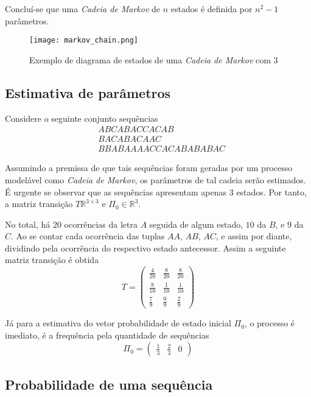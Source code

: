 \documentclass{subfiles}
\begin{document}
Concluí-se que uma \textit{Cadeia de Markov} de $n$ estados é definida por $n^2-1$ parâmetros.

\begin{figure}
	\texttt{[image: markov\_chain.png]}
	\caption{Exemplo de diagrama de estados de uma \textit{Cadeia de Markov} com $3$}
	\label{fig:auto_rep}
\end{figure}

\subsection{Estimativa de parâmetros} \label{sub:exemplo}

Considere o seguinte conjunto sequências
\begin{align*}
	&ABCABACCACAB         \\
	&BACABACAAC           \\
	&BBABAAAACCACABABABAC
\end{align*}

Assumindo a premissa de que tais sequências foram geradas por um processo modelável como \textit{Cadeia de Markov}, os parâmetros de tal cadeia serão estimados. É urgente se observar que as sequências apresentam apenas $3$ estados. Por tanto, a matriz transição $T \mathbb{R}^{3 \times 3}$ e $\Pi_0 \in \mathbb{R}^3$.

No total, há $20$ ocorrências da letra $A$ seguida de algum estado, $10$ da $B$, e $9$ da $C$. Ao se contar cada ocorrência das tuplas $AA$, $AB$, $AC$, e assim por diante, dividindo pela ocorrência do respectivo estado antecessor. Assim a seguinte matriz transição é obtida
\[
    T = \begin{pmatrix}
        \frac{4}{20} & \frac{8}{20} & \frac{8}{20} \\
        \frac{8}{10} & \frac{1}{10} & \frac{1}{10} \\
        \frac{7}{9} & \frac{0}{9} & \frac{2}{9}
    \end{pmatrix}
\]

Já para a estimativa do vetor probabilidade de estado inicial $\Pi_0$, o processo é imediato, é a frequência pela quantidade de sequências
\[
	\Pi_0 = \begin{pmatrix}
		\frac{1}{3} & \frac{2}{3} & 0
	\end{pmatrix}
\]

\subsection{Probabilidade de uma sequência}
\end{document}
